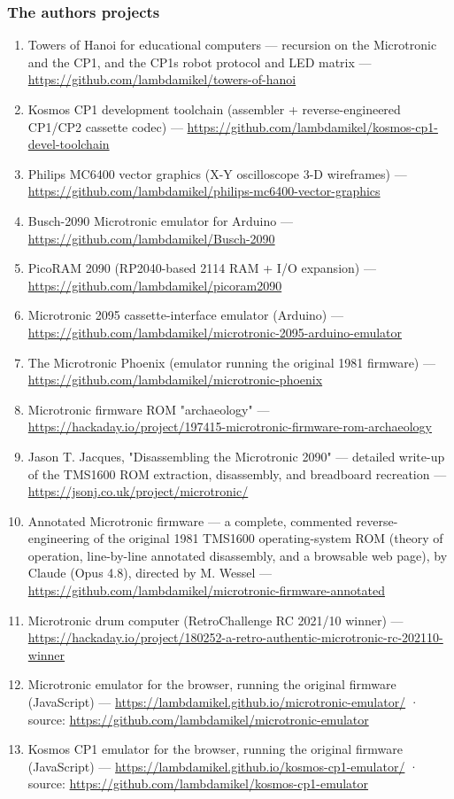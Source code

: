 \documentclass[
  11pt,
  letterpaper,
]{article}
\providecommand{\tightlist}{%
  \setlength{\itemsep}{0pt}\setlength{\parskip}{0pt}}
\begin{document}
\subsubsection{The author\textquotesingle s
projects}\label{the-authors-projects}

\begin{enumerate}
\def\labelenumi{\arabic{enumi}.}
\setcounter{enumi}{9}
\tightlist
\item
  Towers of Hanoi for educational computers --- recursion on the
  Microtronic and the CP1, and the CP1\textquotesingle s robot protocol
  and LED matrix ---
  \url{https://github.com/lambdamikel/towers-of-hanoi}
\item
  Kosmos CP1 development toolchain (assembler + reverse-engineered
  CP1/CP2 cassette codec) ---
  \url{https://github.com/lambdamikel/kosmos-cp1-devel-toolchain}
\item
  Philips MC6400 vector graphics (X-Y oscilloscope 3-D wireframes) ---
  \url{https://github.com/lambdamikel/philips-mc6400-vector-graphics}
\item
  Busch-2090 Microtronic emulator for Arduino ---
  \url{https://github.com/lambdamikel/Busch-2090}
\item
  PicoRAM 2090 (RP2040-based 2114 RAM + I/O expansion) ---
  \url{https://github.com/lambdamikel/picoram2090}
\item
  Microtronic 2095 cassette-interface emulator (Arduino) ---
  \url{https://github.com/lambdamikel/microtronic-2095-arduino-emulator}
\item
  The Microtronic Phoenix (emulator running the original 1981 firmware)
  --- \url{https://github.com/lambdamikel/microtronic-phoenix}
\item
  Microtronic firmware ROM "archaeology" ---
  \url{https://hackaday.io/project/197415-microtronic-firmware-rom-archaeology}
\item
  Jason T. Jacques, "Disassembling the Microtronic 2090" --- detailed
  write-up of the TMS1600 ROM extraction, disassembly, and breadboard
  recreation --- \url{https://jsonj.co.uk/project/microtronic/}
\item
  Annotated Microtronic firmware --- a complete, commented
  reverse-engineering of the original 1981 TMS1600 operating-system ROM
  (theory of operation, line-by-line annotated disassembly, and a
  browsable web page), by Claude (Opus 4.8), directed by M. Wessel ---
  \url{https://github.com/lambdamikel/microtronic-firmware-annotated}
\item
  Microtronic drum computer (RetroChallenge RC 2021/10 winner) ---
  \url{https://hackaday.io/project/180252-a-retro-authentic-microtronic-rc-202110-winner}
\item
  Microtronic emulator for the browser, running the original firmware
  (JavaScript) ---
  \url{https://lambdamikel.github.io/microtronic-emulator/} · source:
  \url{https://github.com/lambdamikel/microtronic-emulator}
\item
  Kosmos CP1 emulator for the browser, running the original firmware
  (JavaScript) ---
  \url{https://lambdamikel.github.io/kosmos-cp1-emulator/} · source:
  \url{https://github.com/lambdamikel/kosmos-cp1-emulator}
\end{enumerate}
\end{document}
